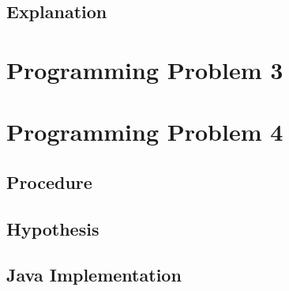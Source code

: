 \documentclass[11pt]{article}
\begin{document}
\subsection*{Explanation}

\section*{Programming Problem 3}

\section*{Programming Problem 4}

\subsection*{Procedure}

\subsection*{Hypothesis}

\subsection*{Java Implementation}
\end{document}
